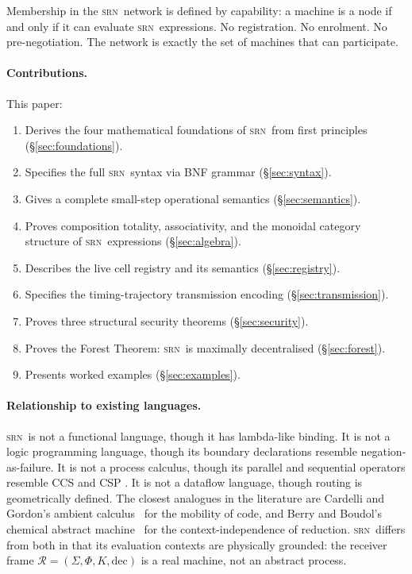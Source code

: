 \documentclass[twocolumn,11pt,a4paper]{article}
\theoremstyle{definition}
\theoremstyle{remark}
\newcommand{\srn}{\textsc{srn}}
\newcommand{\Recv}{\mathcal{R}}
\begin{document}
Membership in the \srn\ network is defined by capability: a machine
is a node if and only if it can evaluate \srn\ expressions.  No
registration.  No enrolment.  No pre-negotiation.  The network is
exactly the set of machines that can participate.

\paragraph{Contributions.}  This paper:
\begin{enumerate}[noitemsep,topsep=2pt]
\item Derives the four mathematical foundations of \srn\ from first
  principles (\S\ref{sec:foundations}).
\item Specifies the full \srn\ syntax via BNF grammar
  (\S\ref{sec:syntax}).
\item Gives a complete small-step operational semantics
  (\S\ref{sec:semantics}).
\item Proves composition totality, associativity, and the monoidal
  category structure of \srn\ expressions (\S\ref{sec:algebra}).
\item Describes the live cell registry and its semantics
  (\S\ref{sec:registry}).
\item Specifies the timing-trajectory transmission encoding
  (\S\ref{sec:transmission}).
\item Proves three structural security theorems
  (\S\ref{sec:security}).
\item Proves the Forest Theorem: \srn\ is maximally decentralised
  (\S\ref{sec:forest}).
\item Presents worked examples (\S\ref{sec:examples}).
\end{enumerate}

\paragraph{Relationship to existing languages.}
\srn\ is not a functional language, though it has lambda-like binding.
It is not a logic programming language, though its boundary declarations
resemble negation-as-failure.  It is not a process calculus, though
its parallel and sequential operators resemble CCS and CSP
\cite{hoare1978communicating,milner1989communication}.  It is not a
dataflow language, though routing is geometrically defined.  The
closest analogues in the literature are Cardelli and Gordon's ambient
calculus~\cite{cardelli2000mobile} for the mobility of code, and
Berry and Boudol's chemical abstract machine~\cite{berry1992chemical}
for the context-independence of reduction.  \srn\ differs from both in
that its evaluation contexts are physically grounded: the receiver
frame $\Recv = (\Sigma, \Phi, K, \mathrm{dec})$ is a real machine, not
an abstract process.
\end{document}
